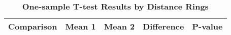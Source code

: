 \begin{table}[htbp]
\centering
\begin{tabular}{l|c c c c}
\hline
Comparison & Mean 1 & Mean 2 & Difference & P-value \\
\hline
\hline
\end{tabular}
\caption{\textbf{One-sample T-test Results by Distance Rings}}
\label{tab:ttests}
\end{table}
